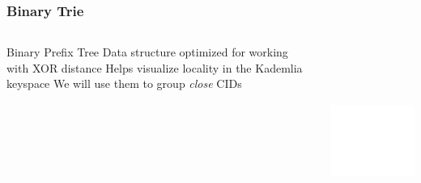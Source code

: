 \documentclass{../pl-slide}
\begin{document}
\begin{frame}
\frametitle{Binary Trie}

\begin{columns}[onlytextwidth]
	\begin{column}{0.39\textwidth}
		\begin{itemize}
			\itemc Binary Prefix Tree
			\itemc Data structure optimized for working with XOR distance
			\itemc Helps visualize locality in the Kademlia keyspace
			\itemc We will use them to group \textit{close} CIDs
		\end{itemize}
	\end{column}
	\begin{column}{0.59\textwidth}
    		\begin{center}
        		\includegraphics[height=17em]{resources/trie-compressed.png}
    		\end{center}
	\end{column}
\end{columns}

\end{frame}
\end{document}
